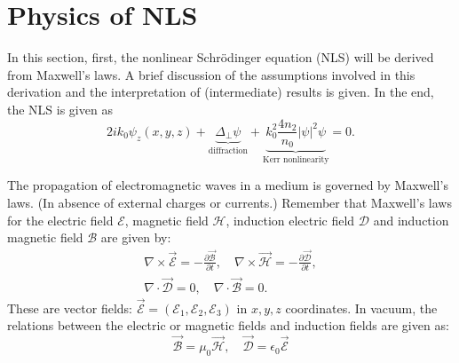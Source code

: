 \section{Physics of NLS}
In this section, first, the nonlinear Schr\"odinger equation (NLS) will be derived from Maxwell's laws.
A brief discussion of the assumptions involved in this derivation
and the interpretation of (intermediate) results is given.
In the end, the NLS is given as
\begin{equation}
  2ik_0\psi_z(x,y,z) + \underbrace{\Delta_\bot\psi}_{\text{diffraction}}
+ \underbrace{k_0^2\frac{4n_2}{n_0}|\psi|^2\psi}_{\text{Kerr nonlinearity}} = 0.
\end{equation}

\seperate

The propagation of electromagnetic waves in a medium is governed by Maxwell's laws.
(In absence of external charges or currents.)
Remember that Maxwell's laws for the electric field $\mathcal{E}$, magnetic field $\mathcal{H}$,
induction electric field $\mathcal{D}$ and induction magnetic field $\mathcal{B}$ are given by:
\begin{equation}
\begin{gathered}
    \nabla\times\vec{\mathcal{E}} = -\frac{\partial \vec{\mathcal{B}}}{\partial t},\quad
    \nabla\times\vec{\mathcal{H}} = -\frac{\partial \vec{\mathcal{D}}}{\partial t},\\
    \nabla\cdotp\vec{\mathcal{D}}=0,\quad
    \nabla\cdotp\vec{\mathcal{B}}=0.
\end{gathered}
\end{equation}
These are vector fields: $\vec{\mathcal{E}}=(\mathcal{E}_1,\mathcal{E}_2,\mathcal{E}_3)$ in $x,y,z$ coordinates.
In vacuum, the relations between the electric or magnetic fields and induction fields are given as:
\begin{equation}
    \vec{\mathcal{B}}=\mu_0\vec{\mathcal{H}},\quad \vec{\mathcal{D}}=\epsilon_0\vec{\mathcal{E}}
\end{equation}

\seperate

